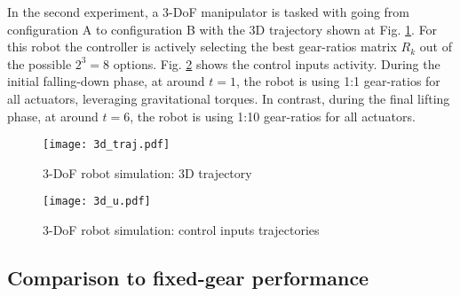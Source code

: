 In the second experiment, a 3-DoF manipulator is tasked with going from configuration A to configuration B with the 3D trajectory shown at Fig. \ref{fig:3d_traj}. For this robot the controller is actively selecting the best gear-ratios matrix $R_k$ out of the possible $2^3=8$ options. Fig. \ref{fig:3d_u} shows the control inputs activity. During the initial falling-down phase, at around $t=1$, the robot is using 1:1 gear-ratios for all actuators, leveraging gravitational torques. In contrast, during the final lifting phase, at around $t=6$, the robot is using 1:10 gear-ratios for all actuators. 
%
%
%
\begin{figure}[htp]
	\centering
		\texttt{[image: 3d\_traj.pdf]}
	\caption{ 3-DoF robot simulation: 3D trajectory }
	\label{fig:3d_traj}
\end{figure}
%
%
\begin{figure}[htp]
	\centering
		\texttt{[image: 3d\_u.pdf]}
	\caption{ 3-DoF robot simulation: control inputs trajectories}
	\label{fig:3d_u}
\end{figure}
%

\subsection{Comparison to fixed-gear performance}

